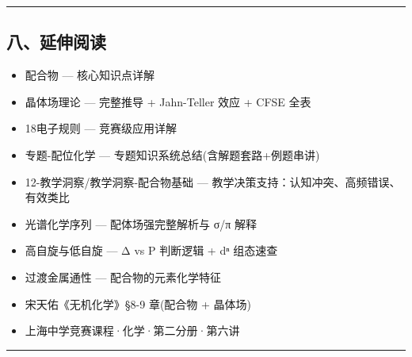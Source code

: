 \begin{center}\rule{0.5\linewidth}{0.5pt}\end{center}

\subsection{八、延伸阅读}\label{ux516bux5ef6ux4f38ux9605ux8bfb}

\begin{itemize}
\tightlist
\item
  配合物 --- 核心知识点详解
\item
  晶体场理论 --- 完整推导 + Jahn-Teller 效应 + CFSE 全表
\item
  18电子规则 --- 竞赛级应用详解
\item
  专题-配位化学 --- 专题知识系统总结(含解题套路+例题串讲)
\item
  12-教学洞察/教学洞察-配合物基础 --- 教学决策支持：认知冲突、高频错误、有效类比
\item
  光谱化学序列 --- 配体场强完整解析与 σ/π 解释
\item
  高自旋与低自旋 --- Δ vs P 判断逻辑 + dⁿ 组态速查
\item
  过渡金属通性 --- 配合物的元素化学特征
\item
  宋天佑《无机化学》§8-9 章(配合物 + 晶体场)
\item
  上海中学竞赛课程·化学·第二分册·第六讲
\end{itemize}

\begin{center}\rule{0.5\linewidth}{0.5pt}\end{center}
